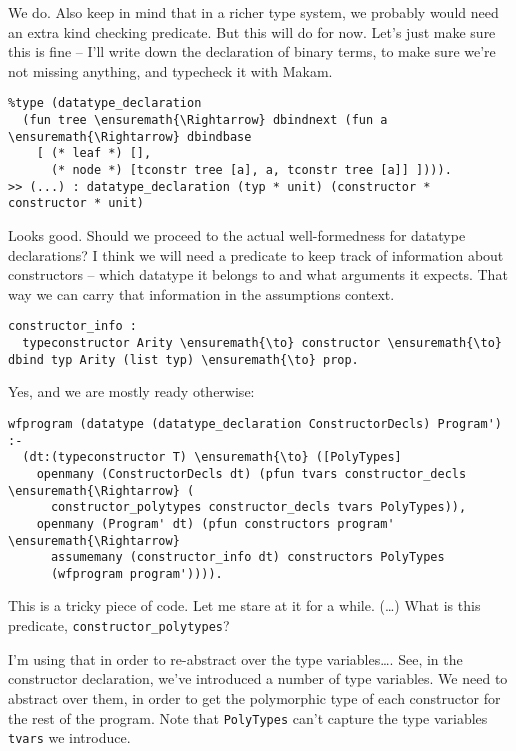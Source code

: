 \heroADVISOR{} We do. Also keep in mind that in a richer type system, we
probably would need an extra kind checking predicate. But this will do
for now. Let's just make sure this is fine -- I'll write down the
declaration of binary terms, to make sure we're not missing anything,
and typecheck it with Makam.

\begin{verbatim}
%type (datatype_declaration
  (fun tree \ensuremath{\Rightarrow} dbindnext (fun a \ensuremath{\Rightarrow} dbindbase
    [ (* leaf *) [],
      (* node *) [tconstr tree [a], a, tconstr tree [a]] ]))).
>> (...) : datatype_declaration (typ * unit) (constructor * constructor * unit)
\end{verbatim}

\heroSTUDENT{} Looks good. Should we proceed to the actual well-formedness for
datatype declarations? I think we will need a predicate to keep track of
information about constructors -- which datatype it belongs to and what
arguments it expects. That way we can carry that information in the
assumptions context.

\begin{verbatim}
constructor_info :
  typeconstructor Arity \ensuremath{\to} constructor \ensuremath{\to} dbind typ Arity (list typ) \ensuremath{\to} prop.
\end{verbatim}

\heroADVISOR{} Yes, and we are mostly ready otherwise:

\begin{verbatim}
wfprogram (datatype (datatype_declaration ConstructorDecls) Program') :-
  (dt:(typeconstructor T) \ensuremath{\to} ([PolyTypes]
    openmany (ConstructorDecls dt) (pfun tvars constructor_decls \ensuremath{\Rightarrow} (
      constructor_polytypes constructor_decls tvars PolyTypes)),
    openmany (Program' dt) (pfun constructors program' \ensuremath{\Rightarrow}
      assumemany (constructor_info dt) constructors PolyTypes
      (wfprogram program')))).
\end{verbatim}

\heroSTUDENT{} This is a tricky piece of code. Let me stare at it for a while.
(\ldots{}) What is this predicate, \texttt{constructor\_polytypes}?

\heroADVISOR{} I'm using that in order to re-abstract over the type
variables\ldots{}. See, in the constructor declaration, we've introduced
a number of type variables. We need to abstract over them, in order to
get the polymorphic type of each constructor for the rest of the
program. Note that \texttt{PolyTypes} can't capture the type variables
\texttt{tvars} we introduce.

